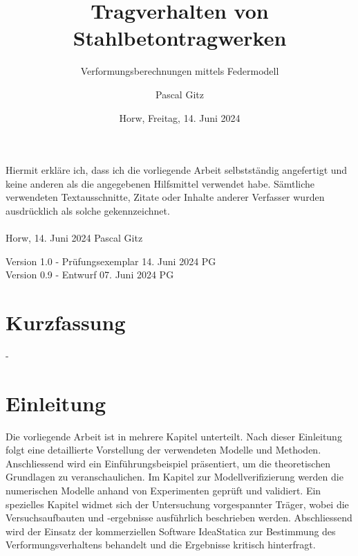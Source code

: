 \documentclass[
  11pt,
  letterpaper,
]{scrreprt}
\title{Tragverhalten von Stahlbetontragwerken}
\subtitle
{Verformungsberechnungen mittels Federmodell}
\date{\large Horw, Freitag, 14. Juni 2024}
\author{Pascal Gitz}
\renewcommand*\contentsname{Inhaltsverzeichnis}
\newcommand\contentsname{Inhaltsverzeichnis}
\begin{document}
\maketitle


Hiermit erkläre ich, dass ich die vorliegende Arbeit selbstständig angefertigt und keine anderen als die angegebenen Hilfsmittel verwendet habe. Sämtliche verwendeten Textausschnitte, Zitate oder Inhalte anderer Verfasser wurden ausdrücklich als solche gekennzeichnet.\\%
%
\\%
%
Horw, 14. Juni 2024 \hfill Pascal Gitz%

\vfill

Version 1.0 - Prüfungsexemplar \hfill 14. Juni 2024 \quad \quad \quad \quad \quad PG\\
Version 0.9 - Entwurf \hfill 07. Juni 2024 \quad \quad \quad \quad \quad PG\\

\newpage

\chapter*{Kurzfassung}

-

\renewcommand*\contentsname{Inhaltsverzeichnis}
{
\hypersetup{linkcolor=}
\setcounter{tocdepth}{1}
\tableofcontents
}
\listoffigures
\listoftables
{}

\chapter{Einleitung}\label{einleitung}

Die vorliegende Arbeit ist in mehrere Kapitel unterteilt. Nach dieser
Einleitung folgt eine detaillierte Vorstellung der verwendeten Modelle
und Methoden. Anschliessend wird ein Einführungsbeispiel präsentiert, um
die theoretischen Grundlagen zu veranschaulichen. Im Kapitel zur
Modellverifizierung werden die numerischen Modelle anhand von
Experimenten geprüft und validiert. Ein spezielles Kapitel widmet sich
der Untersuchung vorgespannter Träger, wobei die Versuchsaufbauten und
-ergebnisse ausführlich beschrieben werden. Abschliessend wird der
Einsatz der kommerziellen Software IdeaStatica zur Bestimmung des
Verformungsverhaltens behandelt und die Ergebnisse kritisch hinterfragt.
\end{document}
